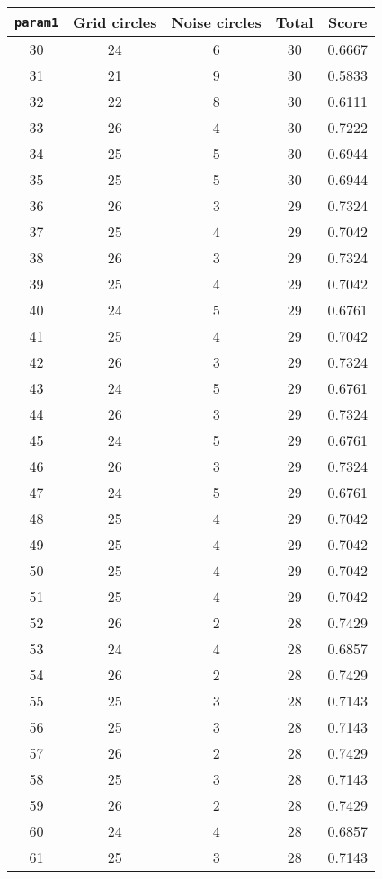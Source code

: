 \documentclass[letterpaper, 12pt]{article}
\begin{document}
\begin{longtable}{|c|c|c|c|c|}
\hline
\textbf{\texttt{param1}} & \textbf{Grid circles} & \textbf{Noise circles} & \textbf{Total} & \textbf{Score} \\
\hline
30 & 24 & 6 & 30 & 0.6667 \\
\hline
31 & 21 & 9 & 30 & 0.5833 \\
\hline
32 & 22 & 8 & 30 & 0.6111 \\
\hline
33 & 26 & 4 & 30 & 0.7222 \\
\hline
34 & 25 & 5 & 30 & 0.6944 \\
\hline
35 & 25 & 5 & 30 & 0.6944 \\
\hline
36 & 26 & 3 & 29 & 0.7324 \\
\hline
37 & 25 & 4 & 29 & 0.7042 \\
\hline
38 & 26 & 3 & 29 & 0.7324 \\
\hline
39 & 25 & 4 & 29 & 0.7042 \\
\hline
40 & 24 & 5 & 29 & 0.6761 \\
\hline
41 & 25 & 4 & 29 & 0.7042 \\
\hline
42 & 26 & 3 & 29 & 0.7324 \\
\hline
43 & 24 & 5 & 29 & 0.6761 \\
\hline
44 & 26 & 3 & 29 & 0.7324 \\
\hline
45 & 24 & 5 & 29 & 0.6761 \\
\hline
46 & 26 & 3 & 29 & 0.7324 \\
\hline
47 & 24 & 5 & 29 & 0.6761 \\
\hline
48 & 25 & 4 & 29 & 0.7042 \\
\hline
49 & 25 & 4 & 29 & 0.7042 \\
\hline
50 & 25 & 4 & 29 & 0.7042 \\
\hline
51 & 25 & 4 & 29 & 0.7042 \\
\hline
52 & 26 & 2 & 28 & 0.7429 \\
\hline
53 & 24 & 4 & 28 & 0.6857 \\
\hline
54 & 26 & 2 & 28 & 0.7429 \\
\hline
55 & 25 & 3 & 28 & 0.7143 \\
\hline
56 & 25 & 3 & 28 & 0.7143 \\
\hline
57 & 26 & 2 & 28 & 0.7429 \\
\hline
58 & 25 & 3 & 28 & 0.7143 \\
\hline
59 & 26 & 2 & 28 & 0.7429 \\
\hline
60 & 24 & 4 & 28 & 0.6857 \\
\hline
61 & 25 & 3 & 28 & 0.7143 \\

\end{longtable}
\end{document}
